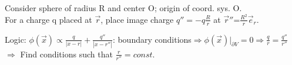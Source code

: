 \begin{squishlist}
\item Consider sphere of radius R and center O; origin of coord. sys. O.\\
For a charge q placed at $\vec{r}$, place image charge $q''=-q\frac{R}{r}$ at $\vec{r}''$=$\frac{R^2}{r}\vec{e}_r$.
\item Logic: 
$\phi(\vec{x})\propto\frac{q}{|x-r|}+\frac{q''}{|x-r''|}$: boundary conditions$\Rightarrow\phi(\vec{x})|_{\partial V}=0\Rightarrow\frac{q}{r}=\frac{q''}{r''}$\\
$\Rightarrow$ Find conditions such that $\frac{r}{r''}=const$.\\
\end{squishlist}


